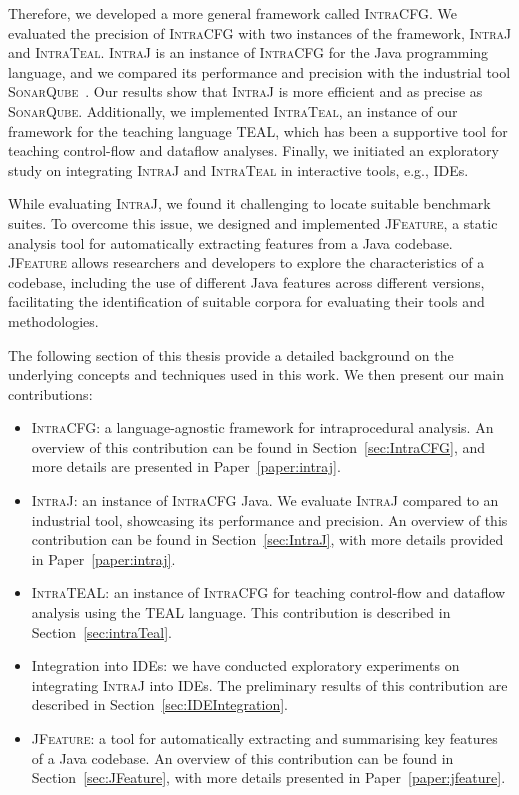 Therefore, we developed a more general framework called \textsc{IntraCFG}.
We evaluated the precision of \textsc{IntraCFG} with two instances of the framework,
\textsc{IntraJ} and \textsc{IntraTeal}.
\textsc{IntraJ} is an instance of \textsc{IntraCFG} for the Java programming language,
and we compared its performance and precision with the industrial tool \textsc{SonarQube}~\cite{sonarqube}. Our results
show that \textsc{IntraJ} is more efficient and as precise as \textsc{SonarQube}.
Additionally, we implemented \textsc{IntraTeal}, an instance of our framework for the teaching
language TEAL, which has been a supportive tool for teaching control-flow and
dataflow analyses. Finally, we initiated an exploratory study on integrating
\textsc{IntraJ} and \textsc{IntraTeal} in interactive tools, e.g., IDEs.

While evaluating \textsc{IntraJ}, we found it challenging to locate suitable
benchmark suites. To overcome this issue, we designed and implemented \textsc{JFeature},
a static analysis tool for automatically extracting features from a Java codebase.
\textsc{JFeature} allows researchers and developers to explore the characteristics of a
codebase, including the use of different Java features across different
versions, facilitating the identification of suitable corpora for evaluating
their tools and methodologies.

The following section of this thesis provide a detailed background on the
underlying concepts and techniques used in this work. We then present our main contributions:
\begin{itemize}
	\item \textsc{IntraCFG}: a language-agnostic framework for intraprocedural analysis.
	 An overview of this contribution can be found in Section~\ref{sec:IntraCFG}, and more details are presented in Paper~\ref{paper:intraj}.
	\item \textsc{IntraJ}: an instance of \textsc{IntraCFG} Java.
	We evaluate \textsc{IntraJ} compared to an industrial tool, showcasing its
	performance and precision. An overview of this contribution can be found in Section~\ref{sec:IntraJ},
	with more details provided in Paper~\ref{paper:intraj}.
	\item \textsc{IntraTEAL}: an instance of \textsc{IntraCFG} for teaching control-flow and  dataflow analysis using the TEAL language.
	This contribution is described in Section~\ref{sec:intraTeal}.
	\item Integration into IDEs: we have conducted exploratory experiments on integrating
	\textsc{IntraJ} into IDEs. The preliminary results of this contribution are described in Section~\ref{sec:IDEIntegration}.
	\item \textsc{JFeature}: a tool for automatically extracting and summarising key
	features of a Java codebase. An overview of this contribution can be found
	in Section~\ref{sec:JFeature}, with more details presented in Paper~\ref{paper:jfeature}.

\end{itemize}


